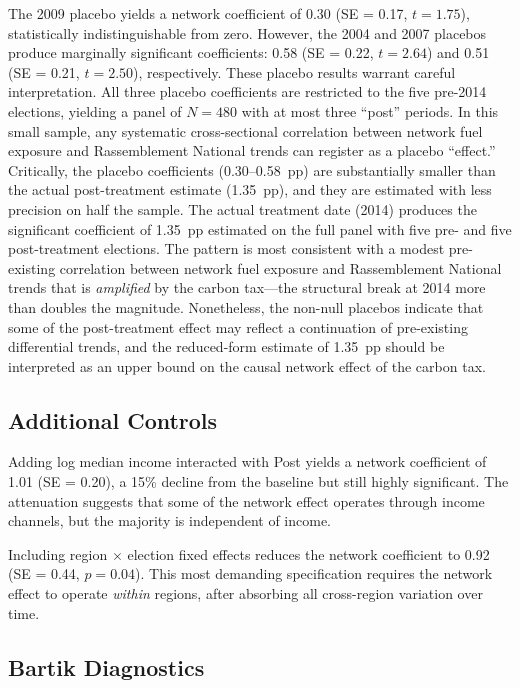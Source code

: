 \documentclass[12pt]{article}
\newcommand{\rn}{Rassemblement National}
\begin{document}
The 2009 placebo yields a network coefficient of 0.30 (SE = 0.17, $t = 1.75$), statistically indistinguishable from zero. However, the 2004 and 2007 placebos produce marginally significant coefficients: 0.58 (SE = 0.22, $t = 2.64$) and 0.51 (SE = 0.21, $t = 2.50$), respectively. These placebo results warrant careful interpretation. All three placebo coefficients are restricted to the five pre-2014 elections, yielding a panel of $N = 480$ with at most three ``post'' periods. In this small sample, any systematic cross-sectional correlation between network fuel exposure and \rn{} trends can register as a placebo ``effect.'' Critically, the placebo coefficients (0.30--0.58~pp) are substantially smaller than the actual post-treatment estimate (1.35~pp), and they are estimated with less precision on half the sample. The actual treatment date (2014) produces the significant coefficient of 1.35~pp estimated on the full panel with five pre- and five post-treatment elections. The pattern is most consistent with a modest pre-existing correlation between network fuel exposure and \rn{} trends that is \emph{amplified} by the carbon tax---the structural break at 2014 more than doubles the magnitude. Nonetheless, the non-null placebos indicate that some of the post-treatment effect may reflect a continuation of pre-existing differential trends, and the reduced-form estimate of 1.35~pp should be interpreted as an upper bound on the causal network effect of the carbon tax.

\subsection{Additional Controls}

Adding log median income interacted with Post yields a network coefficient of 1.01 (SE = 0.20), a 15\% decline from the baseline but still highly significant. The attenuation suggests that some of the network effect operates through income channels, but the majority is independent of income.

Including region $\times$ election fixed effects reduces the network coefficient to 0.92 (SE = 0.44, $p = 0.04$). This most demanding specification requires the network effect to operate \emph{within} regions, after absorbing all cross-region variation over time.

\subsection{Bartik Diagnostics}
\end{document}

